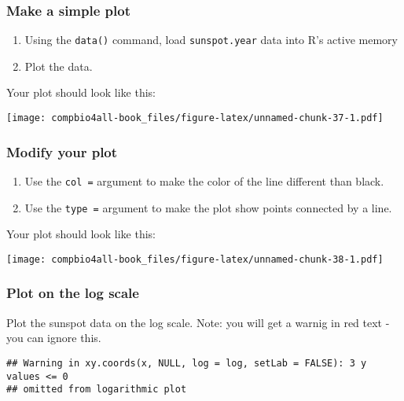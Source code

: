 \documentclass[
]{book}
\providecommand{\tightlist}{%
  \setlength{\itemsep}{0pt}\setlength{\parskip}{0pt}}
\begin{document}
\hypertarget{make-a-simple-plot}{%
\subsubsection*{Make a simple plot}\label{make-a-simple-plot}}

\begin{enumerate}
\def\labelenumi{\arabic{enumi}.}
\tightlist
\item
  Using the \texttt{data()} command, load \texttt{sunspot.year} data into R's active memory
\item
  Plot the data.
\end{enumerate}

Your plot should look like this:

\texttt{[image: compbio4all-book\_files/figure-latex/unnamed-chunk-37-1.pdf]}

\hypertarget{modify-your-plot}{%
\subsubsection*{Modify your plot}\label{modify-your-plot}}

\begin{enumerate}
\def\labelenumi{\arabic{enumi}.}
\tightlist
\item
  Use the \texttt{col\ =} argument to make the color of the line different than black.
\item
  Use the \texttt{type\ =} argument to make the plot show points connected by a line.
\end{enumerate}

Your plot should look like this:

\texttt{[image: compbio4all-book\_files/figure-latex/unnamed-chunk-38-1.pdf]}

\hypertarget{plot-on-the-log-scale}{%
\subsubsection*{Plot on the log scale}\label{plot-on-the-log-scale}}

Plot the sunspot data on the log scale. Note: you will get a warnig in red text - you can ignore this.

\begin{verbatim}
## Warning in xy.coords(x, NULL, log = log, setLab = FALSE): 3 y values <= 0
## omitted from logarithmic plot
\end{verbatim}
\end{document}
